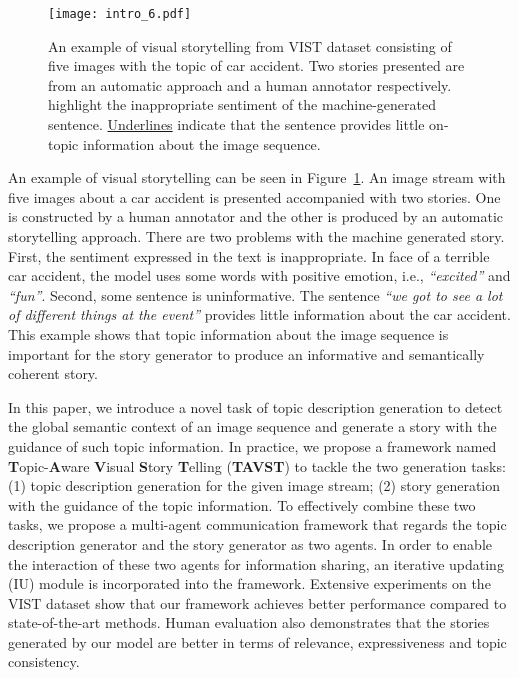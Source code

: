 \documentclass[11pt]{article}
\newcommand{\citep}{\cite}
\begin{document}
\begin{figure} [t]
\begin{center}
\texttt{[image: intro\_6.pdf]}  
\end{center}
\vspace*{-3ex}
   \caption{An example of visual storytelling from VIST dataset consisting of five images with the topic of car accident. Two stories presented are from an automatic approach and a human annotator respectively.  highlight the inappropriate sentiment of the machine-generated sentence. \underline{Underlines} indicate that the sentence provides little on-topic information about the image sequence.}
\label{fig:intro}
\vspace*{-2ex}
\end{figure}

An example of visual storytelling can be seen in Figure~\ref{fig:intro}. An image stream with five images about a car accident is presented accompanied with two stories. One is constructed by a human annotator and the other is produced by an automatic storytelling approach. There are two problems with the machine generated story. First, the sentiment expressed in the text is inappropriate. In face of a terrible car accident, the model uses some words with positive emotion, i.e., \textit{``excited''} and \textit{``fun''}. Second, some sentence is uninformative. The sentence \textit{``we got to see a lot of different things at the event''} provides little information about the car accident. This example shows that topic information about the image sequence is important for the story generator to produce an informative and semantically coherent story. 

In this paper, we introduce a novel task of topic description generation to detect the global semantic context of an image sequence and generate a story with the guidance of such topic information. In practice, we propose a framework named \textbf{T}opic-\textbf{A}ware \textbf{V}isual \textbf{S}tory \textbf{T}elling (\textbf{TAVST}) to tackle the two generation tasks: (1) topic description generation for the given image stream; (2) story generation with the guidance of the topic information. To effectively combine these two tasks, we propose a multi-agent communication framework that regards the topic description generator and the story generator as two agents. In order to enable the interaction of these two agents for information sharing, an iterative updating (IU) module is incorporated into the framework. Extensive experiments on the VIST dataset \citep{huang2016visual} show that our framework achieves better performance compared to state-of-the-art methods. Human evaluation also demonstrates that the stories generated by our model are better in terms of relevance, expressiveness and topic consistency.
\end{document}

